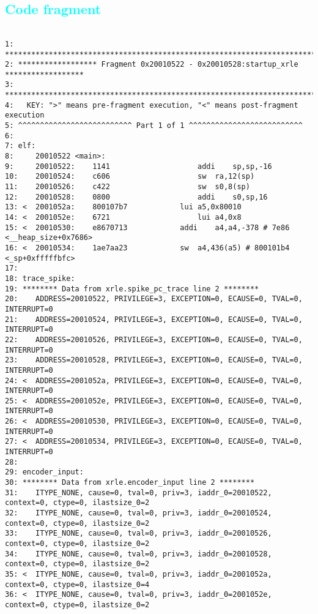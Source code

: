 \textcolor{cyan}{\subsection{Code fragment}}
\begin{lstlisting}[basicstyle=\tiny]

1: ***********************************************************************************
2: ****************** Fragment 0x20010522 - 0x20010528:startup_xrle ******************
3: ***********************************************************************************
4:   KEY: ">" means pre-fragment execution, "<" means post-fragment execution
5: ^^^^^^^^^^^^^^^^^^^^^^^^^^ Part 1 of 1 ^^^^^^^^^^^^^^^^^^^^^^^^^^
6:
7: elf:
8:     20010522 <main>:
9:     20010522:	1141                	addi	sp,sp,-16
10:    20010524:	c606                	sw	ra,12(sp)
11:    20010526:	c422                	sw	s0,8(sp)
12:    20010528:	0800                	addi	s0,sp,16
13: <  2001052a:	800107b7          	lui	a5,0x80010
14: <  2001052e:	6721                	lui	a4,0x8
15: <  20010530:	e8670713          	addi	a4,a4,-378 # 7e86 <__heap_size+0x7686>
16: <  20010534:	1ae7aa23          	sw	a4,436(a5) # 800101b4 <_sp+0xfffffbfc>
17:
18: trace_spike:
19: ******** Data from xrle.spike_pc_trace line 2 ********
20:    ADDRESS=20010522, PRIVILEGE=3, EXCEPTION=0, ECAUSE=0, TVAL=0, INTERRUPT=0
21:    ADDRESS=20010524, PRIVILEGE=3, EXCEPTION=0, ECAUSE=0, TVAL=0, INTERRUPT=0
22:    ADDRESS=20010526, PRIVILEGE=3, EXCEPTION=0, ECAUSE=0, TVAL=0, INTERRUPT=0
23:    ADDRESS=20010528, PRIVILEGE=3, EXCEPTION=0, ECAUSE=0, TVAL=0, INTERRUPT=0
24: <  ADDRESS=2001052a, PRIVILEGE=3, EXCEPTION=0, ECAUSE=0, TVAL=0, INTERRUPT=0
25: <  ADDRESS=2001052e, PRIVILEGE=3, EXCEPTION=0, ECAUSE=0, TVAL=0, INTERRUPT=0
26: <  ADDRESS=20010530, PRIVILEGE=3, EXCEPTION=0, ECAUSE=0, TVAL=0, INTERRUPT=0
27: <  ADDRESS=20010534, PRIVILEGE=3, EXCEPTION=0, ECAUSE=0, TVAL=0, INTERRUPT=0
28:
29: encoder_input:
30: ******** Data from xrle.encoder_input line 2 ********
31:    ITYPE_NONE, cause=0, tval=0, priv=3, iaddr_0=20010522, context=0, ctype=0, ilastsize_0=2
32:    ITYPE_NONE, cause=0, tval=0, priv=3, iaddr_0=20010524, context=0, ctype=0, ilastsize_0=2
33:    ITYPE_NONE, cause=0, tval=0, priv=3, iaddr_0=20010526, context=0, ctype=0, ilastsize_0=2
34:    ITYPE_NONE, cause=0, tval=0, priv=3, iaddr_0=20010528, context=0, ctype=0, ilastsize_0=2
35: <  ITYPE_NONE, cause=0, tval=0, priv=3, iaddr_0=2001052a, context=0, ctype=0, ilastsize_0=4
36: <  ITYPE_NONE, cause=0, tval=0, priv=3, iaddr_0=2001052e, context=0, ctype=0, ilastsize_0=2

\end{lstlisting}
